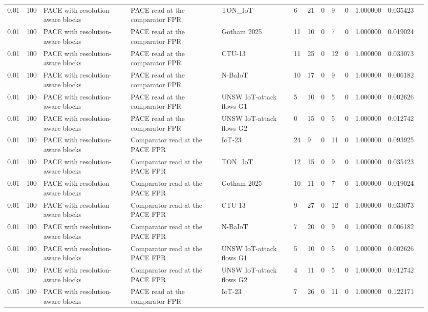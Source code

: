 \begin{tabular}{lllllllllllll}
0.01 & 100 & PACE with resolution-aware blocks & PACE read at the comparator FPR & TON\_IoT & 6 & 21 & 0 & 9 & 0 & 1.000000 & 0.035423 &  \\
0.01 & 100 & PACE with resolution-aware blocks & PACE read at the comparator FPR & Gotham 2025 & 11 & 10 & 0 & 7 & 0 & 1.000000 & 0.019024 &  \\
0.01 & 100 & PACE with resolution-aware blocks & PACE read at the comparator FPR & CTU-13 & 11 & 25 & 0 & 12 & 0 & 1.000000 & 0.033073 &  \\
0.01 & 100 & PACE with resolution-aware blocks & PACE read at the comparator FPR & N-BaIoT & 10 & 17 & 0 & 9 & 0 & 1.000000 & 0.006182 &  \\
0.01 & 100 & PACE with resolution-aware blocks & PACE read at the comparator FPR & UNSW IoT-attack flows G1 & 5 & 10 & 0 & 5 & 0 & 1.000000 & 0.002626 &  \\
0.01 & 100 & PACE with resolution-aware blocks & PACE read at the comparator FPR & UNSW IoT-attack flows G2 & 0 & 15 & 0 & 5 & 0 & 1.000000 & 0.012742 &  \\
0.01 & 100 & PACE with resolution-aware blocks & Comparator read at the PACE FPR & IoT-23 & 24 & 9 & 0 & 11 & 0 & 1.000000 & 0.093925 &  \\
0.01 & 100 & PACE with resolution-aware blocks & Comparator read at the PACE FPR & TON\_IoT & 12 & 15 & 0 & 9 & 0 & 1.000000 & 0.035423 &  \\
0.01 & 100 & PACE with resolution-aware blocks & Comparator read at the PACE FPR & Gotham 2025 & 10 & 11 & 0 & 7 & 0 & 1.000000 & 0.019024 &  \\
0.01 & 100 & PACE with resolution-aware blocks & Comparator read at the PACE FPR & CTU-13 & 9 & 27 & 0 & 12 & 0 & 1.000000 & 0.033073 &  \\
0.01 & 100 & PACE with resolution-aware blocks & Comparator read at the PACE FPR & N-BaIoT & 7 & 20 & 0 & 9 & 0 & 1.000000 & 0.006182 &  \\
0.01 & 100 & PACE with resolution-aware blocks & Comparator read at the PACE FPR & UNSW IoT-attack flows G1 & 5 & 10 & 0 & 5 & 0 & 1.000000 & 0.002626 &  \\
0.01 & 100 & PACE with resolution-aware blocks & Comparator read at the PACE FPR & UNSW IoT-attack flows G2 & 4 & 11 & 0 & 5 & 0 & 1.000000 & 0.012742 &  \\
0.05 & 100 & PACE with resolution-aware blocks & PACE read at the comparator FPR & IoT-23 & 7 & 26 & 0 & 11 & 0 & 1.000000 & 0.122171 &  \\

\end{tabular}
